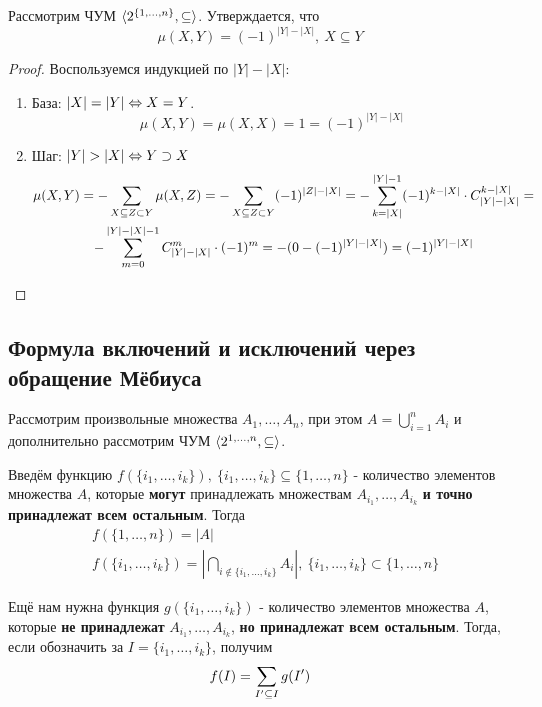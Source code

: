 \begin{theorem}
	Рассмотрим ЧУМ $\langle2^{\{1, \ldots, n\}}, \subseteq\rangle$. Утверждается, что
	\[
		\mu(X, Y) = (-1)^{|Y| - |X|},\ X \subseteq Y
	\]
\end{theorem}

\begin{proof}
	Воспользуемся индукцией по $|Y| - |X|$:
	\begin{enumerate}
		\item База: $|X| = |Y| \Leftrightarrow X = Y$.
		\[
			\mu(X, Y) = \mu(X, X) = 1 = (-1)^{|Y| - |X|}
		\]
		
		\item Шаг: $|Y| > |X| \Leftrightarrow Y \supset X$
		\begin{multline*}
			\mu(X, Y) = -\sum\limits_{X \subseteq Z \subset Y} \mu(X, Z) = -\sum\limits_{X \subseteq Z \subset Y} (-1)^{|Z| - |X|} = -\sum\limits_{k = |X|}^{|Y| - 1} (-1)^{k - |X|} \cdot C_{|Y| - |X|}^{k - |X|} =
			\\
			-\sum\limits_{m = 0}^{|Y| - |X| - 1} C_{|Y| - |X|}^m \cdot (-1)^m = -(0 - (-1)^{|Y| - |X|}) = (-1)^{|Y| - |X|}
		\end{multline*}
	\end{enumerate}
\end{proof}

\subsection{Формула включений и исключений через обращение Мёбиуса}

Рассмотрим произвольные множества $A_1, \ldots, A_n$, при этом $A = \bigcup_{i = 1}^n A_i$ и  дополнительно рассмотрим ЧУМ $\langle2^{1, \ldots, n}, \subseteq\rangle$.

Введём функцию $f(\{i_1, \ldots, i_k\}),\ \{i_1, \ldots, i_k\} \subseteq \{1, \ldots, n\}$ - количество элементов множества $A$, которые \textbf{могут} принадлежать множествам $A_{i_1}, \ldots, A_{i_k}$ \textbf{и точно принадлежат всем остальным}. Тогда
\begin{align*}
	&{f(\{1, \ldots, n\}) = |A|}
	\\
	&{f(\{i_1, \ldots, i_k\}) = \left|\bigcap_{i \notin \{i_1, \ldots, i_k\}} A_i\right|,\ \{i_1, \ldots, i_k\} \subset \{1, \ldots, n\}}
\end{align*}

Ещё нам нужна функция $g(\{i_1, \ldots, i_k\})$ - количество элементов множества $A$, которые \textbf{не принадлежат} $A_{i_1}, \ldots, A_{i_k}$, \textbf{но принадлежат всем остальным}. Тогда, если обозначить за $I = \{i_1, \ldots, i_k\}$, получим
\[
	f(I) = \sum\limits_{I' \subseteq I} g(I')
\]

